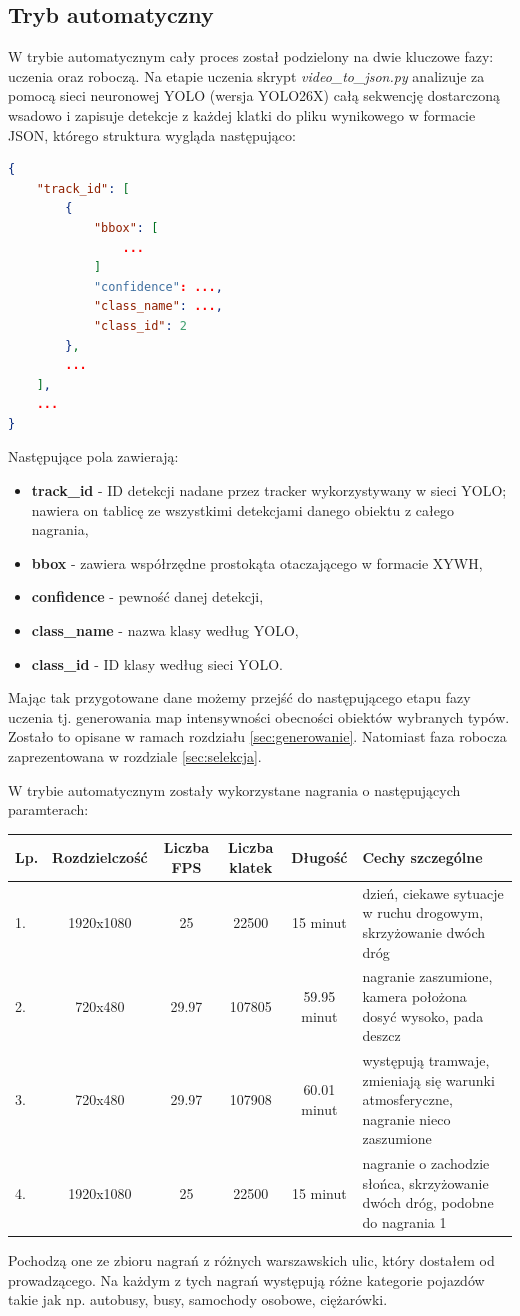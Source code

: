 \documentclass[a4paper]{article}
\begin{document}
\subsection{Tryb automatyczny}
W trybie automatycznym cały proces został podzielony na dwie kluczowe fazy: uczenia oraz roboczą. Na etapie uczenia skrypt \textit{video\_to\_json.py} analizuje za pomocą sieci neuronowej YOLO (wersja YOLO26X) całą sekwencję dostarczoną wsadowo i zapisuje detekcje z każdej klatki do pliku wynikowego w formacie JSON, którego struktura wygląda następująco:
\begin{lstlisting}[language=json]
{
    "track_id": [
        {
            "bbox": [
                ...
            ]
            "confidence": ...,
            "class_name": ...,
            "class_id": 2
        },
        ...
    ],
    ...
}
\end{lstlisting}
Następujące pola zawierają:
\begin{itemize}
    \item \textbf{track\_id} - ID detekcji nadane przez tracker wykorzystywany w sieci YOLO; nawiera on tablicę ze wszystkimi detekcjami danego obiektu z całego nagrania,
    \item \textbf{bbox} - zawiera współrzędne prostokąta otaczającego w formacie XYWH,
    \item \textbf{confidence} - pewność danej detekcji,
    \item \textbf{class\_name} - nazwa klasy według YOLO,
    \item \textbf{class\_id} - ID klasy według sieci YOLO.
\end{itemize}
Mając tak przygotowane dane możemy przejść do następującego etapu fazy uczenia tj. generowania map intensywności obecności obiektów wybranych typów. Zostało to opisane w ramach rozdziału \ref{sec:generowanie}. Natomiast faza robocza zaprezentowana w rozdziale \ref{sec:selekcja}.

W trybie automatycznym zostały wykorzystane nagrania o następujących paramterach:
\begin{table}[H]
\centering
\begin{tabular}{l|c|c|c|c|p{5cm}}
\toprule
     \textbf{Lp.} & \textbf{Rozdzielczość} & \textbf{Liczba FPS} & \textbf{Liczba klatek} & \textbf{Długość} & \textbf{Cechy szczególne}\\
\midrule
    1. & 1920x1080 & 25 & 22500 & 15 minut & dzień, ciekawe sytuacje w ruchu drogowym, skrzyżowanie dwóch dróg \\
    2. & 720x480 & 29.97 & 107805 & 59.95 minut  &  nagranie zaszumione, kamera położona dosyć wysoko, pada deszcz\\
    3. & 720x480 & 29.97 & 107908 & 60.01 minut &  występują tramwaje, zmieniają się warunki atmosferyczne, nagranie nieco zaszumione\\
    4. & 1920x1080 & 25 & 22500 & 15 minut & nagranie o zachodzie słońca, skrzyżowanie dwóch dróg, podobne do nagrania 1 \\
\bottomrule
\end{tabular}
\end{table}
Pochodzą one ze zbioru nagrań z różnych warszawskich ulic, który dostałem od prowadzącego. Na każdym z tych nagrań występują różne kategorie pojazdów takie jak np. autobusy, busy, samochody osobowe, ciężarówki.
\end{document}
